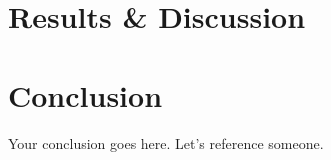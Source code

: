 \documentclass[11pt]{article}
\begin{document}
\section{Results \& Discussion}

\section{Conclusion}



Your conclusion goes here. Let's reference someone.



\end{document}
